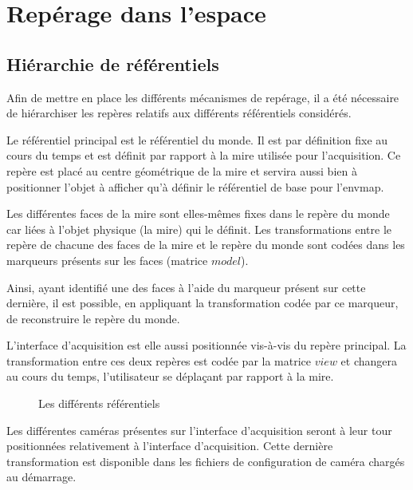 \documentclass[10pt,a4paper,twoside, twocolumn]{report}
\newcommand*{\rootPath}{../}
\begin{document}
\chapter{Repérage dans l'espace}

\section{Hiérarchie de référentiels}

Afin de mettre en place les différents mécanismes de repérage, il a été nécessaire de hiérarchiser les repères relatifs aux différents référentiels considérés.

Le référentiel principal est le référentiel du monde. Il est par définition fixe au cours du temps et est définit par rapport à la mire utilisée pour l'acquisition. Ce repère est placé au centre géométrique de la mire et servira aussi bien à positionner l'objet à afficher qu'à définir le référentiel de base pour l'envmap.

Les différentes faces de la mire sont elles-mêmes fixes dans le repère du monde car liées à l'objet physique (la mire) qui le définit. Les transformations entre le repère de chacune des faces de la mire et le repère du monde sont codées dans les marqueurs présents sur les faces (matrice $model$).

Ainsi, ayant identifié une des faces à l'aide du marqueur présent sur cette dernière, il est possible, en appliquant la transformation codée par ce marqueur, de reconstruire le repère du monde.

L'interface d'acquisition est elle aussi positionnée vis-à-vis du repère principal. La transformation entre ces deux repères est codée par la matrice $view$ et changera au cours du temps, l'utilisateur se déplaçant par rapport à la mire.

\begin{figure}[!ht]
	\centering
	
	\caption{Les différents référentiels}
	\label{fig:tikz:spaceHierarchie}
\end{figure}

Les différentes caméras présentes sur l'interface d'acquisition seront à leur tour positionnées relativement à l'interface d'acquisition. Cette dernière transformation est disponible dans les fichiers de configuration de caméra chargés au démarrage.
\end{document}
